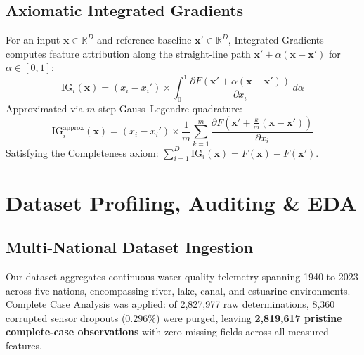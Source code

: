 \documentclass[conference]{IEEEtran}
\begin{document}
\subsection{Axiomatic Integrated Gradients}
For an input $\mathbf{x} \in \mathbb{R}^D$ and reference baseline $\mathbf{x}' \in \mathbb{R}^D$, Integrated Gradients computes feature attribution along the straight-line path $\mathbf{x}' + \alpha(\mathbf{x} - \mathbf{x}')$ for $\alpha \in [0, 1]$:
\begin{equation}
  \text{IG}_i(\mathbf{x}) = (x_i - x_i') \times \int_{0}^{1} \frac{\partial F\left(\mathbf{x}' + \alpha(\mathbf{x} - \mathbf{x}')\right)}{\partial x_i} \, d\alpha
  \label{eq:ig}
\end{equation}
Approximated via $m$-step Gauss--Legendre quadrature:
\begin{equation}
  \text{IG}_i^{\text{approx}}(\mathbf{x}) = (x_i - x_i') \times \frac{1}{m}\sum_{k=1}^m \frac{\partial F\left(\mathbf{x}' + \frac{k}{m}(\mathbf{x} - \mathbf{x}')\right)}{\partial x_i}
\end{equation}
Satisfying the Completeness axiom: $\sum_{i=1}^D \text{IG}_i(\mathbf{x}) = F(\mathbf{x}) - F(\mathbf{x}')$.

\section{Dataset Profiling, Auditing \& EDA}
\label{sec:data}

\subsection{Multi-National Dataset Ingestion}
Our dataset aggregates continuous water quality telemetry spanning 1940 to 2023 across five nations, encompassing river, lake, canal, and estuarine environments. Complete Case Analysis was applied: of 2,827,977 raw determinations, 8,360 corrupted sensor dropouts ($0.296\%$) were purged, leaving \textbf{2,819,617 pristine complete-case observations} with zero missing fields across all measured features.
\end{document}
